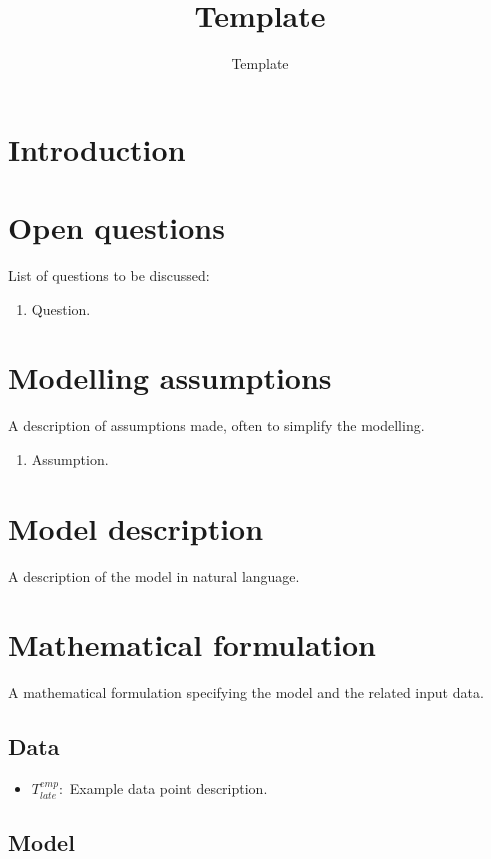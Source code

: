 \documentclass[12pt, a4paper, leqno]{article}
\title{Template}
\author{Template}
\begin{document}
\maketitle

\section{Introduction}

\section{Open questions}

List of questions to be discussed:

\begin{enumerate}
    \item Question.
\end{enumerate}

\section{Modelling assumptions}

A description of assumptions made, often to simplify the modelling.

\begin{enumerate}
    \item Assumption.
\end{enumerate}

\section{Model description}

A description of the model in natural language.

\section{Mathematical formulation}

A mathematical formulation specifying the model and the related input data.

\subsection{Data}

\begin{itemize}
    \item
        \begin{math}
            T^{emp}_{late}:
        \end{math}
        Example data point description.
\end{itemize}

\subsection{Model}

\todos
\end{document}
